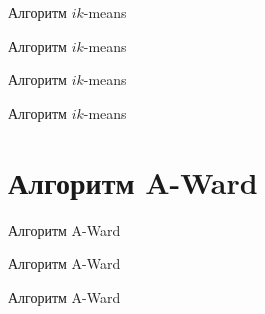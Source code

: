 \documentclass[aspectratio=169,tikz]{beamer}
\newcommand{\AWard}{\mbox{A-Ward}\xspace}
\newcommand{\ikmeans}{\mbox{$ ik $-means}\xspace}
\begin{document}
	\begin{frame}{Алгоритм \ikmeans}
		\begin{figure} %
			\centering
			
		\end{figure}
	\end{frame}	
	
	\begin{frame}{Алгоритм \ikmeans}
		\begin{figure} %
			\centering
			
		\end{figure}
	\end{frame}	
		
	\begin{frame}{Алгоритм \ikmeans}
		\begin{figure} %
			\centering
			
		\end{figure}
	\end{frame}	
	
		
	\begin{frame}{Алгоритм \ikmeans}
		\begin{figure} %
			\centering
			
		\end{figure}
	\end{frame}	
	
	\section{Алгоритм \AWard}

	\begin{frame}{Алгоритм \AWard}
		\begin{figure} %
			\centering
			
		\end{figure}
	\end{frame}	

	\begin{frame}{Алгоритм \AWard}
		\begin{figure} %
			\centering
			
		\end{figure}
	\end{frame}	
	
	\begin{frame}{Алгоритм \AWard}
		\begin{figure} %
			\centering
			
		\end{figure}
	\end{frame}	
	
\end{document}
